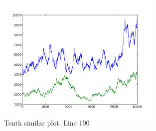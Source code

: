 \begin{figure}[h!]
    \centering
    \includegraphics[width=0.7\textwidth]{images/190.png}
    \caption{Tenth similar plot.  Line 190}
    \label{fig:ex1_10}
\end{figure}

